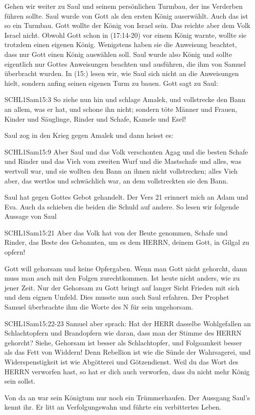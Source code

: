 \documentclass[12pt]{../../inc/mybib}
\newenvironment{block}[1][]{%
  \vspace{1.5em}%
  \noindent\textbf{#1}\par%
  \vspace{0.0em}%
}{%
  \vspace{1em}%
}
\begin{document}
\begin{block}
    Gehen wir weiter zu Saul und seinem persönlichen Turmbau, der ins Verderben führen sollte. Saul wurde von Gott als den ersten König auserwählt. Auch das ist so ein Turmbau. Gott wollte der König von Israel sein. Das reichte aber dem Volk Israel nicht. Obwohl Gott schon in (17:14-20) vor einem König warnte, wollte sie trotzdem einen eigenen König. Wenigstens haben sie die Anweisung beachtet, dass nur Gott einen König auswählen soll. Saul wurde also König und sollte eigentlich nur Gottes Anweisungen beachten und ausführen, die ihm von Samuel überbracht wurden. In (15:) lesen wir, wie Saul sich nicht an die Anweisungen hielt, sondern anfing seinen eigenen Turm zu bauen. Gott sagt zu Saul:
    \begin{bibelbox}{SCHL}{1Sam}{15:3}
        So ziehe nun hin und schlage Amalek, und vollstrecke den Bann an allem, was er hat, und schone ihn nicht; sondern töte Männer und Frauen, Kinder und Säuglinge, Rinder und Schafe, Kamele und Esel!
    \end{bibelbox}
    Saul zog in den Krieg gegen Amalek und dann heisst es:
    \begin{bibelbox}{SCHL}{1Sam}{15:9}
        Aber Saul und das Volk verschonten Agag und die besten Schafe und Rinder und das Vieh vom zweiten Wurf und die Mastschafe und alles, was wertvoll war, und sie wollten den Bann an ihnen nicht vollstrecken; alles Vieh aber, das wertlos und schwächlich war, an dem vollstreckten sie den Bann.
    \end{bibelbox}
    Saul hat gegen Gottes Gebot gehandelt. Der Vers 21 erinnert mich an Adam und Eva. Auch da schieben die beiden die Schuld auf andere. So lesen wir folgende Aussage von Saul
    \begin{bibelbox}{SCHL}{1Sam}{15:21}
        Aber das Volk hat von der Beute genommen, Schafe und Rinder, das Beste des Gebannten, um es dem HERRN, deinem Gott, in Gilgal zu opfern!
    \end{bibelbox}
    Gott will gehorsam und keine Opfergaben. Wenn man Gott nicht gehorcht, dann muss man auch mit den Folgen zurechtkommen. Ist heute nicht anders, wie zu jener Zeit. Nur der Gehorsam zu Gott bringt auf langer Sicht Frieden mit sich und dem eignen Umfeld. Dies musste nun auch Saul erfahren. Der Prophet Samuel überbrachte ihm die Worte des \herr N für sein ungehorsam.    
    \begin{bibelbox}{SCHL}{1Sam}{15:22-23}
        Samuel aber sprach: Hat der HERR dasselbe Wohlgefallen an Schlachtopfern und Brandopfern wie daran, dass man der Stimme des HERRN gehorcht? Siehe, Gehorsam ist besser als Schlachtopfer, und Folgsamkeit besser als das Fett von Widdern! Denn Rebellion ist wie die Sünde der Wahrsagerei, und Widerspenstigkeit ist wie Abgötterei und Götzendienst. Weil du das Wort des HERRN verworfen hast, so hat er dich auch verworfen, dass du nicht mehr König sein sollst.
    \end{bibelbox} 
    Von da an war sein Königtum nur noch ein Trümmerhaufen. Der Aussgang Saul's kennt ihr. Er litt an Verfolgungswahn und führte ein verbittertes Leben.
\end{block}
\end{document}
